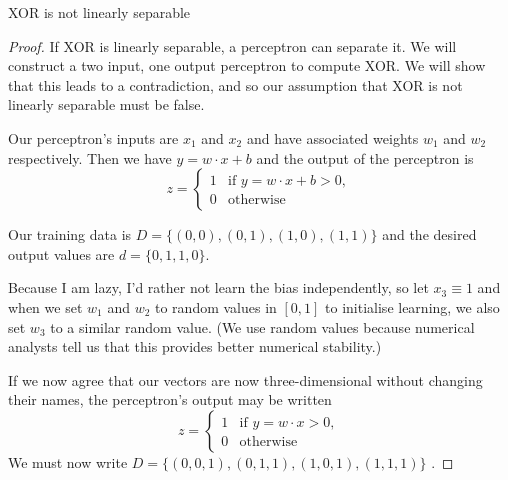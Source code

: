 \documentclass[12 pt]{report}
\begin{document}
\centerline{\Large XOR is not linearly separable}
\bigskip


\begin{proof}

  If XOR is linearly separable, a perceptron can separate it.
  We will construct a two input, one output perceptron to compute XOR.
  We will show that this leads to a contradiction, and so our
  assumption that XOR is not linearly separable must be false.

  Our perceptron's inputs are $x_1$ and $x_2$ and have associated
  weights $w_1$ and $w_2$ respectively.  Then we have $y=w\cdot x + b$
  and the output of the perceptron is
  \begin{displaymath}
    z = \begin{cases}
      1 & \mbox{if } y = w\cdot x + b > 0, \\
      0 & \mbox{otherwise}
    \end{cases}
  \end{displaymath}

  Our training data is $D=\{ (0, 0), (0, 1), (1, 0), (1, 1) \}$ and the
  desired output values are $d=\{0, 1, 1, 0\}$.

  Because I am lazy, I'd rather not learn the bias independently, so
  let $x_3\equiv 1$ and when we set $w_1$ and $w_2$ to random values
  in $[0,1]$ to initialise learning, we also set $w_3$ to a similar
  random value.  (We use random values because numerical analysts tell
  us that this provides better numerical stability.)

  If we now agree that our vectors are now three-dimensional without
  changing their names, the perceptron's output may be written
  \begin{equation}
    \label{z}
    z = \begin{cases}
      1 & \mbox{if } y = w\cdot x > 0, \\
      0 & \mbox{otherwise}
    \end{cases}
  \end{equation}
  We must now write $D=\{ (0, 0, 1), (0, 1, 1), (1, 0, 1), (1, 1, 1) \}$ .


\end{proof}
\end{document}
